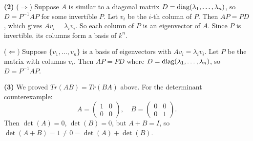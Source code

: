 \documentclass{report}
\begin{document}
\begin{solution}
\textbf{(2)} (\(\Rightarrow\)) Suppose \(A\) is similar to a diagonal matrix \(D = \operatorname{diag}(\lambda_1, \ldots, \lambda_n)\), so \(D = P^{-1}AP\) for some invertible \(P\). Let \(v_i\) be the \(i\)-th column of \(P\). Then \(AP = PD\), which gives \(Av_i = \lambda_i v_i\). So each column of \(P\) is an eigenvector of \(A\). Since \(P\) is invertible, its columns form a basis of \(k^n\).

(\(\Leftarrow\)) Suppose \(\{v_1, \ldots, v_n\}\) is a basis of eigenvectors with \(Av_i = \lambda_i v_i\). Let \(P\) be the matrix with columns \(v_i\). Then \(AP = PD\) where \(D = \operatorname{diag}(\lambda_1, \ldots, \lambda_n)\), so \(D = P^{-1}AP\).

\textbf{(3)} We proved \(Tr(AB) = Tr(BA)\) above. For the determinant counterexample:
\[A = \begin{pmatrix} 1 & 0 \\ 0 & 0 \end{pmatrix}, \quad B = \begin{pmatrix} 0 & 0 \\ 0 & 1 \end{pmatrix}.\]
Then \(\det(A) = 0\), \(\det(B) = 0\), but \(A + B = I\), so \(\det(A + B) = 1 \neq 0 = \det(A) + \det(B)\).
\end{solution}
\end{document}
